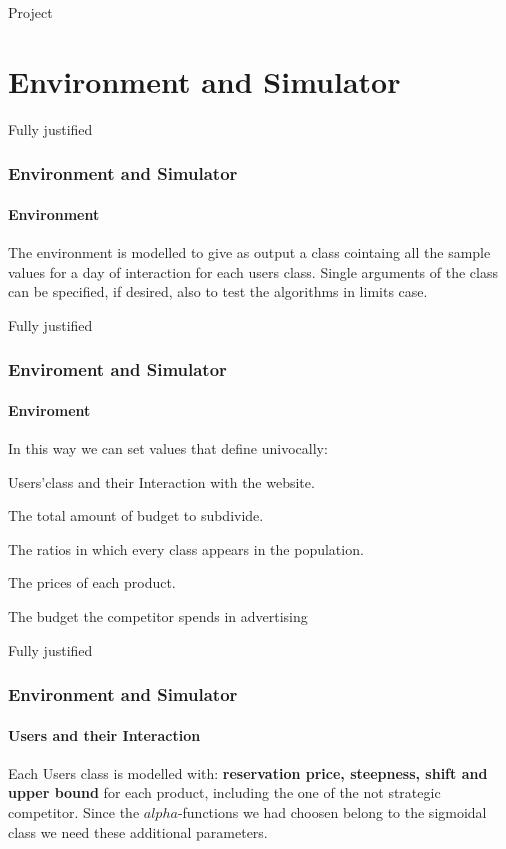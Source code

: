 \documentclass{beamer}
\begin{document}
\frame{\titlepage}




\begin{frame}{Project}
    \tableofcontents[hideallsubsections]
\end{frame}

\AtBeginSection[ ]
{
\begin{frame}{}
    \tableofcontents[currentsection]
\end{frame}
}
\section{Environment and Simulator}
 
\begin{frame}{Fully justified}
\frametitle{Environment and Simulator}
\framesubtitle{Environment}
The environment is modelled to give as output a class cointaing all the sample values for a day of interaction for each users class.
Single arguments of the class can be specified, if desired, also to test the algorithms in limits case.
\end {frame}

\begin{frame}{Fully justified}
\frametitle{Enviroment and Simulator}
\framesubtitle{Enviroment}
In this way we can set values that define univocally:
\vspace{0.5cm}
\begin{list}{-}{\setlength{\itemsep}{0.5cm}}
    \item Users'class and their Interaction with the website.
    \item The total amount of budget to subdivide.
    \item The ratios in which every class appears in the population.
    \item The prices of each product.
    \item The budget the competitor spends in advertising
\end{list}
\end {frame}

\begin {frame}{Fully justified}
\frametitle{Environment and Simulator}
\framesubtitle{Users and their Interaction}
Each Users class is modelled with:\textbf{ reservation price, steepness, shift and upper bound} 
for each product, including the one of the not strategic competitor.
Since the $alpha$-functions we had choosen belong to the sigmoidal class we need these additional parameters.
\end {frame}
\end{document}
